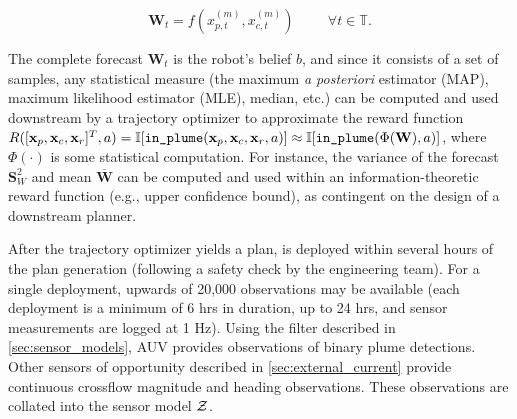 \begin{equation}
    \mathbf{W}_t = f(x_{p,t}^{(m)}, x_{c,t}^{(m)}) \hspace{1cm} \forall t \in \mathbb{T}.
\end{equation}

The complete forecast $\mathbf{W}_t$ is the robot's belief $b$, and since it consists of a set of samples, any statistical measure (the maximum \emph{a posteriori} estimator (MAP), maximum likelihood estimator (MLE), median, etc.) can be computed and used downstream by a trajectory optimizer to approximate the reward function $R([\x_p, \x_c, \x_r]^T, a) = \indic{\texttt{in\_plume}(\x_p, \x_c, \x_r, a)} \approx \indic{\texttt{in\_plume}(\Phi(\mathbf{W}), a)}$, where $\Phi(\cdot)$ is some statistical computation. For instance, the variance of the forecast $\mathbf{S}^2_W$ and mean $\overbar{\mathbf{W}}$ can be computed and used within an information-theoretic reward function (e.g., upper confidence bound), as contingent on the design of a downstream planner. 

After the trajectory optimizer yields a plan, \Sentry is deployed within several hours of the plan generation (following a safety check by the engineering team). For a single deployment, upwards of 20,000 observations may be available (each deployment is a minimum of 6 hrs in duration, up to 24 hrs, and sensor measurements are logged at 1 Hz). Using the filter described in \cref{sec:sensor_models}, AUV \Sentry provides observations of binary plume detections. Other sensors of opportunity described in \cref{sec:external_current} provide continuous crossflow magnitude and heading observations. These observations are collated into the sensor model $\mathcal{Z}$.

